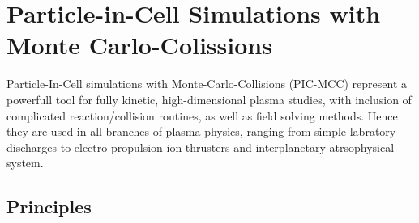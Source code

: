 %
	\section{Particle-in-Cell Simulations with Monte Carlo-Colissions}\label{sec:picsimulationmcc}
%
	Particle-In-Cell simulations with Monte-Carlo-Collisions (PIC-MCC) represent a powerfull tool for fully kinetic, high-dimensional plasma studies, with inclusion of complicated reaction/collision routines, as well as field solving methods. Hence they are used in all branches of plasma physics, ranging from simple labratory discharges to electro-propulsion ion-thrusters and interplanetary atrsophysical system. 
%	
		\subsection{Principles}\label{sec:picbasics}
